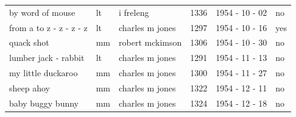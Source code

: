 \documentclass{article}
\begin{document}
\begin{tabular}{llllll}
by word of mouse & lt & i freleng & 1336 & 1954 - 10 - 02 & no \\
from a to z - z - z - z & lt & charles m jones & 1297 & 1954 - 10 - 16 & yes \\
quack shot & mm & robert mckimson & 1306 & 1954 - 10 - 30 & no \\
lumber jack - rabbit & lt & charles m jones & 1291 & 1954 - 11 - 13 & no \\
my little duckaroo & mm & charles m jones & 1300 & 1954 - 11 - 27 & no \\
sheep ahoy & mm & charles m jones & 1322 & 1954 - 12 - 11 & no \\
baby buggy bunny & mm & charles m jones & 1324 & 1954 - 12 - 18 & no \\
\bottomrule
\end{tabular}
\end{document}
